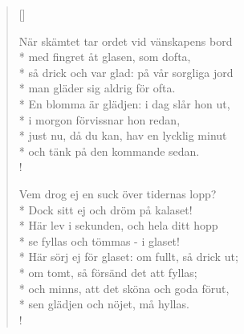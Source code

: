 
\settowidth{\versewidth}{När skämtet tar ordet vid vänskapens bord}



\begin{verse}[\versewidth]


När skämtet tar ordet vid vänskapens bord\\*
med fingret åt glasen, som dofta,\\*
så drick och var glad: på vår sorgliga jord\\*
man gläder sig aldrig för ofta.\\*
En blomma är glädjen: i dag slår hon ut,\\*
i morgon förvissnar hon redan,\\*
just nu, då du kan, hav en lycklig minut\\*
och tänk på den kommande sedan.\\!


Vem drog ej en suck över tidernas lopp?\\*
Dock sitt ej och dröm på kalaset!\\*
Här lev i sekunden, och hela ditt hopp\\*
se fyllas och tömmas - i glaset!\\*
Här sörj ej för glaset: om fullt, så drick ut;\\*
om tomt, så försänd det att fyllas;\\*
och minns, att det sköna och goda förut,\\*
sen glädjen och nöjet, må hyllas.\\!

\end{verse}


